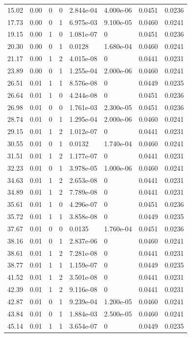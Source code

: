 \documentclass[preview]{standalone}
\begin{document}
{{\begin{tabular}{L{1.2cm}C{1.2cm} C{0.3cm}C{0.5cm} C{1.4cm}C{1.4cm} C{1.4cm}C{1.4cm}}
  15.02  &  0.00  & 0     &  0 &  2.844e-04  & 4.000e-06  & 0.0451 &  0.0236   \\ 
  17.73  &  0.00  & 0     &  1 &  6.975e-03  & 9.100e-05  & 0.0460 &  0.0241   \\ 
  19.15  &  0.00  & 1     &  0 &  1.081e-07  & 0  & 0.0451 &  0.0236   \\ 
  20.30  &  0.00  & 0     &  1 &  0.0128  & 1.680e-04  & 0.0460 &  0.0241   \\ 
  21.17  &  0.00  & 1     &  2 &  4.015e-08  & 0  & 0.0441 &  0.0231   \\ 
  23.89  &  0.00  & 0     &  1 &  1.255e-04  & 2.000e-06  & 0.0460 &  0.0241   \\ 
  26.51  &  0.01  & 1     &  1 &  8.576e-08  & 0  & 0.0449 &  0.0235   \\ 
  26.64  &  0.01  & 1     &  0 &  4.244e-08  & 0  & 0.0451 &  0.0236   \\ 
  26.98  &  0.01  & 0     &  0 &  1.761e-03  & 2.300e-05  & 0.0451 &  0.0236   \\ 
  28.74  &  0.01  & 0     &  1 &  1.295e-04  & 2.000e-06  & 0.0460 &  0.0241   \\ 
  29.15  &  0.01  & 1     &  2 &  1.012e-07  & 0  & 0.0441 &  0.0231   \\ 
  30.55  &  0.01  & 0     &  1 &  0.0132  & 1.740e-04  & 0.0460 &  0.0241   \\ 
  31.51  &  0.01  & 1     &  2 &  1.177e-07  & 0  & 0.0441 &  0.0231   \\ 
  32.23  &  0.01  & 0     &  1 &  3.978e-05  & 1.000e-06  & 0.0460 &  0.0241   \\ 
  34.63  &  0.01  & 1     &  2 &  2.653e-08  & 0  & 0.0441 &  0.0231   \\ 
  34.89  &  0.01  & 1     &  2 &  7.789e-08  & 0  & 0.0441 &  0.0231   \\ 
  35.61  &  0.01  & 1     &  0 &  4.296e-07  & 0  & 0.0451 &  0.0236   \\ 
  35.72  &  0.01  & 1     &  1 &  3.858e-08  & 0  & 0.0449 &  0.0235   \\ 
  37.67  &  0.01  & 0     &  0 &  0.0135  & 1.760e-04  & 0.0451 &  0.0236   \\ 
  38.16  &  0.01  & 0     &  1 &  2.837e-06  & 0  & 0.0460 &  0.0241   \\ 
  38.61  &  0.01  & 1     &  2 &  7.281e-08  & 0  & 0.0441 &  0.0231   \\ 
  38.77  &  0.01  & 1     &  1 &  1.159e-07  & 0  & 0.0449 &  0.0235   \\ 
  41.52  &  0.01  & 1     &  2 &  3.501e-08  & 0  & 0.0441 &  0.0231   \\ 
  42.39  &  0.01  & 1     &  2 &  9.116e-08  & 0  & 0.0441 &  0.0231   \\ 
  42.87  &  0.01  & 0     &  1 &  9.239e-04  & 1.200e-05  & 0.0460 &  0.0241   \\ 
  43.84  &  0.01  & 0     &  1 &  1.884e-03  & 2.500e-05  & 0.0460 &  0.0241   \\ 
  45.14  &  0.01  & 1     &  1 &  3.654e-07  & 0  & 0.0449 &  0.0235   \\ 
\hline 
\end{tabular} 

}}
\end{document}
